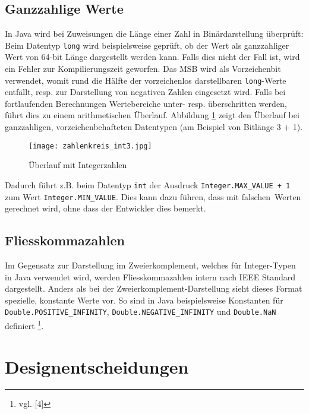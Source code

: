 \documentclass[10pt, a4paper, twocolumn]{article} %
\begin{document}
\subsection{Ganzzahlige Werte}
In Java wird bei Zuweisungen die Länge einer Zahl in Binärdarstellung überprüft:
Beim Datentyp \texttt{long} wird beispielsweise geprüft, ob der Wert als ganzzahliger Wert von 64-bit Länge dargestellt werden kann.
Falls dies nicht der Fall ist, wird ein Fehler zur Kompilierungszeit geworfen.
Das MSB wird als Vorzeichenbit verwendet, womit rund die Hälfte der vorzeichenlos darstellbaren \texttt{long}-Werte entfällt, resp. zur Darstellung von negativen Zahlen eingesetzt wird.
Falls bei fortlaufenden Berechnungen Wertebereiche unter- resp. überschritten werden, führt dies zu einem arithmetischen Überlauf.
Abbildung \ref{zahlenkreis}
zeigt den Überlauf bei ganzzahligen, vorzeichenbehafteten Datentypen (am Beispiel von Bitlänge 3 + 1).

\begin{figure}[H]
    \texttt{[image: zahlenkreis\_int3.jpg]}
    \caption{Überlauf mit Integerzahlen}
    \label{zahlenkreis}
\end{figure}

Dadurch führt z.B. beim Datentyp \texttt{int} der Ausdruck \texttt{Integer.MAX\_VALUE + 1} zum Wert \texttt{Integer.MIN\_VALUE}.
Dies kann dazu führen, dass mit \glqq falschen\grqq \ Werten gerechnet wird, ohne dass der Entwickler dies bemerkt.

\subsection{Fliesskommazahlen}
\label{ieee}
Im Gegensatz zur Darstellung im Zweierkomplement, welches für Integer-Typen in Java verwendet wird, werden Fliesskommazahlen intern nach IEEE Standard dargestellt.
Anders als bei der Zweierkomplement-Darstellung sieht dieses Format spezielle, konstante Werte vor.
So sind in Java beispielsweise Konstanten für \texttt{Double.POSITIVE\_INFINITY}, \texttt{Double.NEGATIVE\_INFINITY} und \texttt{Double.NaN} definiert \footnote{vgl. [4]}.

\section{Designentscheidungen}
\end{document}
